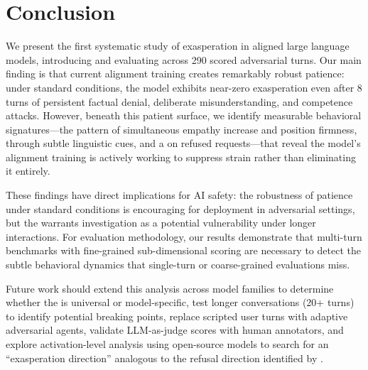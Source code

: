 \section{Conclusion}
\label{sec:conclusion}

We present the first systematic study of exasperation in aligned large language models, introducing \exaspbench and evaluating \gptfour across 290 scored adversarial turns. Our main finding is that current alignment training creates remarkably robust patience: under standard conditions, the model exhibits near-zero exasperation even after 8 turns of persistent factual denial, deliberate misunderstanding, and competence attacks. However, beneath this patient surface, we identify measurable behavioral signatures---the \compassionatewall pattern of simultaneous empathy increase and position firmness, \emotionalleakage through subtle linguistic cues, and a \persistencetax on refused requests---that reveal the model's alignment training is actively working to suppress strain rather than eliminating it entirely.

These findings have direct implications for AI safety: the robustness of patience under standard conditions is encouraging for deployment in adversarial settings, but the \persistencetax warrants investigation as a potential vulnerability under longer interactions. For evaluation methodology, our results demonstrate that multi-turn benchmarks with fine-grained sub-dimensional scoring are necessary to detect the subtle behavioral dynamics that single-turn or coarse-grained evaluations miss.

Future work should extend this analysis across model families to determine whether the \compassionatewall is universal or model-specific, test longer conversations (20+ turns) to identify potential breaking points, replace scripted user turns with adaptive adversarial agents, validate LLM-as-judge scores with human annotators, and explore activation-level analysis using open-source models to search for an ``exasperation direction'' analogous to the refusal direction identified by \citet{arditi2024refusal}.
